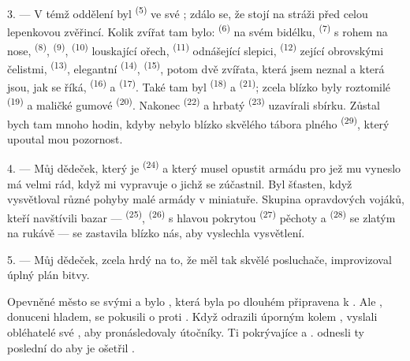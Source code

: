 3. --- V témž oddělení byl  \textsuperscript{(5)} ve své
; zdálo se, že stojí na stráži před celou lepenkovou zvěřincí. Kolik
zvířat tam bylo:  \textsuperscript{(6)} na svém bidélku,
 \textsuperscript{(7)} s rohem na nose, 
\textsuperscript{(8)},  \textsuperscript{(9)}, 
\textsuperscript{(10)} louskající ořech,  \textsuperscript{(11)}
odnášející slepici,  \textsuperscript{(12)} zející obrovskými
čelistmi,  \textsuperscript{(13)}, elegantní 
\textsuperscript{(14)},  \textsuperscript{(15)}, potom dvě zvířata,
která jsem neznal a která jsou, jak se říká,  \textsuperscript{(16)} a
 \textsuperscript{(17)}. Také tam byl 
\textsuperscript{(18)} a  \textsuperscript{(21)}; zcela blízko byly
roztomilé  \textsuperscript{(19)} a maličké gumové 
\textsuperscript{(20)}. Nakonec  \textsuperscript{(22)} a hrbatý
 \textsuperscript{(23)} uzavírali sbírku. Zůstal bych tam mnoho hodin,
kdyby nebylo blízko skvělého tábora plného 
\textsuperscript{(29)}, který upoutal mou pozornost.

\VUsaut{4.0mm}
\VUsaut{2.8mm}

4. --- Můj dědeček, který je  \textsuperscript{(24)} a který musel
opustit armádu pro  jež mu vyneslo  má
velmi rád, když mi vypravuje o  jichž se zúčastnil. Byl šťasten,
když vysvětloval různé pohyby malé armády v miniatuře. Skupina opravdových vojáků, kteří
navštívili bazar ---  \textsuperscript{(25)}, 
\textsuperscript{(26)} s hlavou pokrytou  
\textsuperscript{(27)} pěchoty a 
\textsuperscript{(28)} se zlatým  na rukávě --- se zastavila blízko
nás, aby vyslechla vysvětlení.

5. --- Můj dědeček, zcela hrdý na to, že měl tak skvělé posluchače, improvizoval úplný
plán bitvy.

Opevněné město se svými  a  bylo 
, která byla po dlouhém  připravena k
. Ale , donuceni hladem, se pokusili o 
proti  . Když odrazili  úporným
 kolem , vyslali  obléhatelé své
, aby pronásledovaly  útočníky. Ti
 pokrývajíce   a .
 odnesli ty poslední do  aby je ošetřil
.

